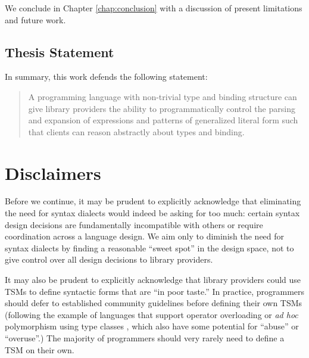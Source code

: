 We conclude in Chapter \ref{chap:conclusion} with a discussion of present limitations and future work.

\subsection{Thesis Statement}
In summary, this work defends the following statement:

\begin{quote}
A programming language with non-trivial type and binding structure can give library providers the ability to %
programmatically control the parsing and expansion of expressions and patterns of generalized literal form such that clients can reason abstractly about types and binding. %
\end{quote}

\section{Disclaimers}
Before we continue, it may be prudent to explicitly acknowledge that eliminating the need for syntax dialects would indeed be asking for too much: certain syntax design decisions are fundamentally incompatible with others or require coordination across a language design. We aim only to diminish the need for syntax dialects by finding a reasonable ``sweet spot'' in the design space, not to give control over all design decisions to library providers. %

It may also be prudent to explicitly acknowledge that library providers could use TSMs  to define syntactic forms that are ``in poor taste.'' In practice, programmers should defer to established community guidelines before defining their own TSMs (following the example of languages that support operator overloading or \emph{ad hoc} polymorphism using type classes \cite{Hall:1996:TCH:227699.227700,conf/popl/DreyerHCK07}, which also have some potential for ``abuse'' or ``overuse''.) %
The majority of programmers should very rarely need to define a TSM on their own.

